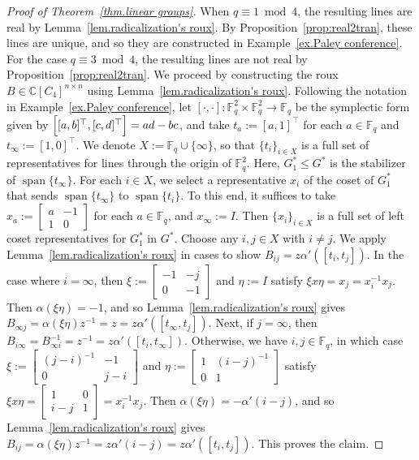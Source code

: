 \begin{proof}[Proof of Theorem~\ref{thm.linear groups}]
When $q\equiv1\bmod4$, the resulting lines are real by Lemma~\ref{lem.radicalization's roux}.
By Proposition~\ref{prop:real2tran}, these lines are unique, and so they are constructed in Example~\ref{ex.Paley conference}.
For the case $q\equiv3\bmod4$, the resulting lines are not real by Proposition~\ref{prop:real2tran}.
We proceed by constructing the roux $B\in\mathbb{C}[C_4]^{n\times n}$ using Lemma~\ref{lem.radicalization's roux}.
Following the notation in Example~\ref{ex.Paley conference}, let $[\cdot,\cdot] : \mathbb{F}_q^2 \times \mathbb{F}_q^2 \to \mathbb{F}_q$ be the symplectic form given by $\Bigl[ [ a,b]^\top, [c,d]^\top \Bigr] = ad - bc$, and take $t_a:=[a,1]^\top$ for each $a\in\mathbb{F}_q$ and $t_\infty:=[1,0]^\top$.
We denote $X:=\mathbb{F}_q \cup \{ \infty \}$, so that $\{ t_i \}_{i \in X}$ is a full set of representatives for lines through the origin of $\mathbb{F}_q^2$.
Here, $G^*_1\leq G^*$ is the stabilizer of $\operatorname{span}\{t_\infty\}$.
For each $i\in X$, we select a representative $x_i$ of the coset of $G^*_1$ that sends $\operatorname{span}\{t_\infty\}$ to $\operatorname{span}\{t_i\}$.
To this end, it suffices to take $x_a:=\left[\begin{array}{cc}a&-1\\1&0\end{array}\right]$ for each $a\in\mathbb{F}_q$, and $x_\infty:=I$.
Then  $\{x_i\}_{i\in X}$ is a full set of left coset representatives for $G^*_1$ in $G^*$.
Choose any $i,j\in X$ with $i\neq j$.
We apply Lemma~\ref{lem.radicalization's roux} in cases to show $B_{ij} = z \alpha'([t_i,t_j])$.
In the case where $i=\infty$, then $\xi:=\left[\begin{array}{cc}-1&-j\\0&-1\end{array}\right]$ and $\eta:=I$ satisfy $\xi x \eta = x_j = x_i^{-1}x_j$.
Then $\alpha(\xi \eta) = -1$, and so Lemma~\ref{lem.radicalization's roux} gives $B_{\infty j}=\alpha(\xi\eta)z^{-1}=z = z \alpha'([t_\infty, t_j])$.
Next, if $j=\infty$, then $B_{i\infty}=B_{\infty i}^{-1}=z^{-1} = z \alpha'([t_i, t_\infty])$.
Otherwise, we have $i,j\in\mathbb{F}_q$, in which case $\xi:=\left[\begin{array}{cc}(j-i)^{-1}&-1\\0&j-i\end{array}\right]$ and $\eta:=\left[\begin{array}{cc}1&(i-j)^{-1}\\0&1\end{array}\right]$ satisfy $\xi x \eta = \left[\begin{array}{cc}1&0\\i-j&1\end{array}\right] = x_i^{-1}x_j$.
Then $\alpha(\xi\eta)=-\alpha'(i-j)$, and so Lemma~\ref{lem.radicalization's roux} gives $B_{ij}=\alpha(\xi\eta)z^{-1}=z\alpha'(i-j)=z\alpha'([t_i,t_j])$.
This proves the claim.


\end{proof}
